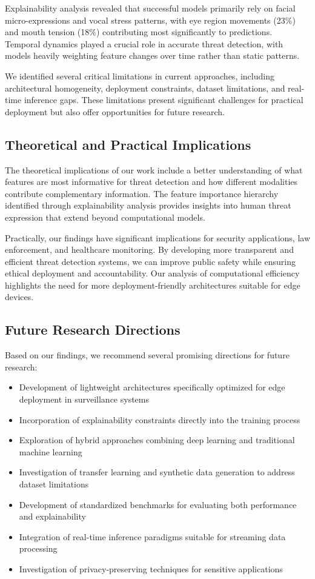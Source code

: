 \documentclass[conference,compsoc]{IEEEtran}
\begin{document}
Explainability analysis revealed that successful models primarily rely on facial micro-expressions and vocal stress patterns, with eye region movements (23\%) and mouth tension (18\%) contributing most significantly to predictions. Temporal dynamics played a crucial role in accurate threat detection, with models heavily weighting feature changes over time rather than static patterns.

We identified several critical limitations in current approaches, including architectural homogeneity, deployment constraints, dataset limitations, and real-time inference gaps. These limitations present significant challenges for practical deployment but also offer opportunities for future research.

\subsection{Theoretical and Practical Implications}
The theoretical implications of our work include a better understanding of what features are most informative for threat detection and how different modalities contribute complementary information. The feature importance hierarchy identified through explainability analysis provides insights into human threat expression that extend beyond computational models.

Practically, our findings have significant implications for security applications, law enforcement, and healthcare monitoring. By developing more transparent and efficient threat detection systems, we can improve public safety while ensuring ethical deployment and accountability. Our analysis of computational efficiency highlights the need for more deployment-friendly architectures suitable for edge devices.

\subsection{Future Research Directions}
Based on our findings, we recommend several promising directions for future research:

\begin{itemize}
    \item Development of lightweight architectures specifically optimized for edge deployment in surveillance systems
    \item Incorporation of explainability constraints directly into the training process
    \item Exploration of hybrid approaches combining deep learning and traditional machine learning
    \item Investigation of transfer learning and synthetic data generation to address dataset limitations
    \item Development of standardized benchmarks for evaluating both performance and explainability
    \item Integration of real-time inference paradigms suitable for streaming data processing
    \item Investigation of privacy-preserving techniques for sensitive applications
\end{itemize}
\end{document}
